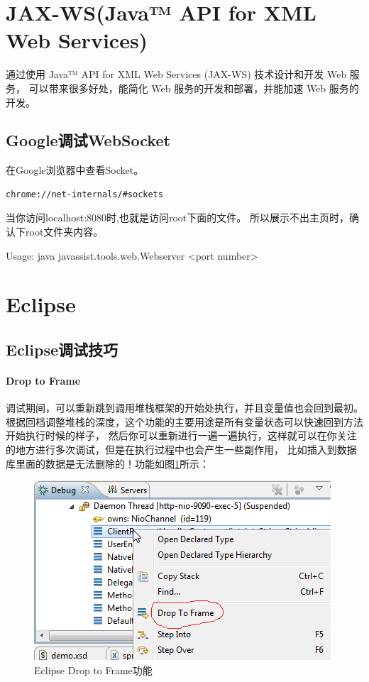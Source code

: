 \documentclass{book}
\begin{document}
\section{JAX-WS(Java™ API for XML Web Services)}

通过使用 Java™ API for XML Web Services (JAX-WS) 技术设计和开发 Web 服务，
可以带来很多好处，能简化 Web 服务的开发和部署，并能加速 Web 服务的开发。

\subsection{Google调试WebSocket}

在Google浏览器中查看Socket。


\begin{lstlisting}[language=HTML]
chrome://net-internals/#sockets
\end{lstlisting}

当你访问localhost:8080时,也就是访问root下面的文件。
所以展示不出主页时，确认下root文件夹内容。

Usage: java javassist.tools.web.Webserver <port number>

\section{Eclipse}

\subsection{Eclipse调试技巧}

\paragraph{Drop to Frame}
调试期间，可以重新跳到调用堆栈框架的开始处执行，并且变量值也会回到最初。
根据回档调整堆栈的深度，这个功能的主要用途是所有变量状态可以快速回到方法开始执行时候的样子，
然后你可以重新进行一遍一遍执行，这样就可以在你关注的地方进行多次调试，但是在执行过程中也会产生一些副作用，
比如插入到数据库里面的数据是无法删除的！功能如图\ref{code:EclipseDropToFrame}所示：

\begin{figure}[htbp]
	\centering
	\includegraphics[scale=0.6]{EclipseDropToFrame.png}
	\caption{Eclipse Drop to Frame功能}
	\label{code:EclipseDropToFrame}
\end{figure}
\end{document}
